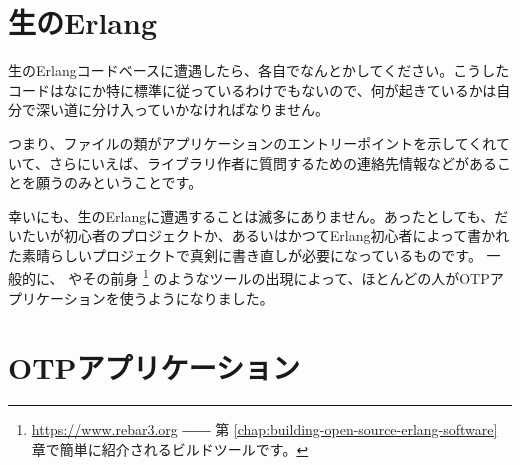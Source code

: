 \section{生のErlang}
\label{sec:dive-raw-erlang}

生のErlangコードベースに遭遇したら、各自でなんとかしてください。こうしたコードはなにか特に標準に従っているわけでもないので、何が起きているかは自分で深い道に分け入っていかなければなりません。

つまり、ファイルの類がアプリケーションのエントリーポイントを示してくれていて、さらにいえば、ライブラリ作者に質問するための連絡先情報などがあることを願うのみということです。

幸いにも、生のErlangに遭遇することは滅多にありません。あったとしても、だいたいが初心者のプロジェクトか、あるいはかつてErlang初心者によって書かれた素晴らしいプロジェクトで真剣に書き直しが必要になっているものです。
一般的に、  やその前身 \footnote{\href{https://www.rebar3.org}{https://www.rebar3.org} ―― 第 \ref{chap:building-open-source-erlang-software} 章で簡単に紹介されるビルドツールです。} のようなツールの出現によって、ほとんどの人がOTPアプリケーションを使うようになりました。

\section{OTPアプリケーション}
\label{sec:dive-otp-applications}


